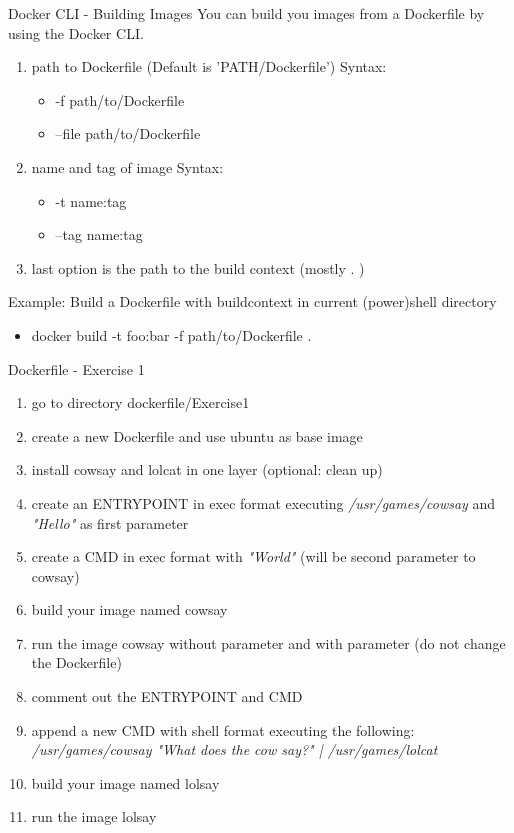 \documentclass[10pt,aspectratio=\ratio,
compress
]{beamer}
\begin{document}
\begin{frame}{Docker CLI - Building Images}
You can build you images from a Dockerfile by using the Docker CLI. \\

\begin{enumerate}
\item path to Dockerfile (Default is 'PATH/Dockerfile')
Syntax:
\begin{itemize}
	\item -f path/to/Dockerfile
	\item --file path/to/Dockerfile
\end{itemize}
\item name and tag of image
Syntax:
\begin{itemize}
	\item -t name:tag
	\item --tag name:tag
\end{itemize}
\item last option is the path to the build context (mostly . )
\end{enumerate}

Example: Build a Dockerfile with buildcontext in current (power)shell directory
\begin{itemize}
	\item docker build -t foo:bar -f path/to/Dockerfile .
\end{itemize}
\end{frame}

\begin{frame}{Dockerfile - Exercise 1}
\begin{enumerate}
	\item go to directory dockerfile/Exercise1
	\item create a new Dockerfile and use ubuntu as base image
	\item install cowsay and lolcat in one layer (optional: clean up)
	\item create an ENTRYPOINT in exec format executing \emph{/usr/games/cowsay} and \emph{"Hello"} as first parameter
	\item create a CMD in exec format with \emph{"World"} (will be second parameter to cowsay)
	\item build your image named cowsay
	\item run the image cowsay without parameter and with parameter (do not change the Dockerfile)
	\item comment out the ENTRYPOINT and CMD
	\item append a new CMD with shell format executing the following: \\ \emph{/usr/games/cowsay "What does the cow say?" | /usr/games/lolcat}
	\item build your image named lolsay
	\item run the image lolsay
\end{enumerate}
\end{frame}
\end{document}
